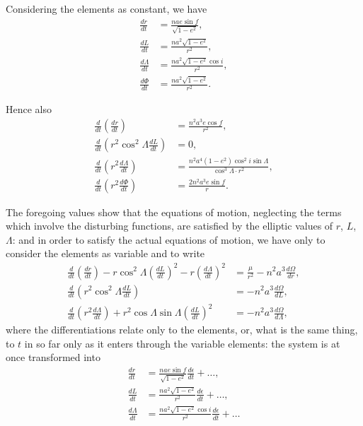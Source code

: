 \documentclass[12pt,a4paper]{article}
\theoremstyle{plain}
\begin{document}
Considering the elements as constant, we have
\begin{align*}
\frac{dr}{dt} &= \frac{nae\sin f}{\sqrt{1-e^2}}, \\
\frac{dL}{dt} &= \frac{na^2\sqrt{1-e^2}}{r^2}, \\
\frac{d\Lambda}{dt} &= \frac{na^2\sqrt{1-e^2}\cos i}{r^2}, \\
\frac{d\Phi}{dt} &= \frac{na^2\sqrt{1-e^2}}{r^2}.
\end{align*}

Hence also
\begin{align*}
\frac{d}{dt}\left(\frac{dr}{dt}\right) &= \frac{n^2a^3e\cos f}{r^2}, \\
\frac{d}{dt}\left(r^2\cos^2\Lambda\frac{dL}{dt}\right) &= 0, \\
\frac{d}{dt}\left(r^2\frac{d\Lambda}{dt}\right) &= \frac{n^2a^4(1-e^2)\cos^2 i\sin\Lambda}{\cos^3\Lambda \cdot r^2}, \\
\frac{d}{dt}\left(r^2\frac{d\Phi}{dt}\right) &= \frac{2n^2a^3e\sin f}{r}.
\end{align*}

The foregoing values show that the equations of motion, neglecting the terms which involve the disturbing functions, are satisfied by the elliptic values of $r$, $L$, $\Lambda$: and in order to satisfy the actual equations of motion, we have only to consider the elements as variable and to write
\begin{align*}
\frac{d}{dt}\left(\frac{dr}{dt}\right) - r\cos^2\Lambda\left(\frac{dL}{dt}\right)^2 - r\left(\frac{d\Lambda}{dt}\right)^2 &= \frac{\mu}{r^2} - n^2a^3\frac{d\Omega}{dr}, \\
\frac{d}{dt}\left(r^2\cos^2\Lambda\frac{dL}{dt}\right) &= -n^2a^3\frac{d\Omega}{dL}, \\
\frac{d}{dt}\left(r^2\frac{d\Lambda}{dt}\right) + r^2\cos\Lambda\sin\Lambda\left(\frac{dL}{dt}\right)^2 &= -n^2a^3\frac{d\Omega}{d\Lambda},
\end{align*}
where the differentiations relate only to the elements, or, what is the same thing, to $t$ in so far only as it enters through the variable elements: the system is at once transformed into
\begin{align*}
\frac{dr}{dt} &= \frac{nae\sin f}{\sqrt{1-e^2}}\frac{d\epsilon}{dt} + \ldots, \\
\frac{dL}{dt} &= \frac{na^2\sqrt{1-e^2}}{r^2}\frac{d\epsilon}{dt} + \ldots, \\
\frac{d\Lambda}{dt} &= \frac{na^2\sqrt{1-e^2}\cos i}{r^2}\frac{d\epsilon}{dt} + \ldots
\end{align*}
\end{document}
